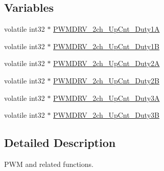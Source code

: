 \subsection*{Variables}
\begin{DoxyCompactItemize}
\item 
volatile int32 $\ast$ \hyperlink{a00038_a8a02650c6afb411447157faf0e90a7b2}{P\-W\-M\-D\-R\-V\-\_\-2ch\-\_\-\-Up\-Cnt\-\_\-\-Duty1\-A}
\item 
volatile int32 $\ast$ \hyperlink{a00038_a23767edc2ebfabc9336684185a4f2d84}{P\-W\-M\-D\-R\-V\-\_\-2ch\-\_\-\-Up\-Cnt\-\_\-\-Duty1\-B}
\item 
volatile int32 $\ast$ \hyperlink{a00038_acc76d5ffc745e63de05baa242bb3d16f}{P\-W\-M\-D\-R\-V\-\_\-2ch\-\_\-\-Up\-Cnt\-\_\-\-Duty2\-A}
\item 
volatile int32 $\ast$ \hyperlink{a00038_a3215b15b28994e0840d64200f09cbfb0}{P\-W\-M\-D\-R\-V\-\_\-2ch\-\_\-\-Up\-Cnt\-\_\-\-Duty2\-B}
\item 
volatile int32 $\ast$ \hyperlink{a00038_a86962b3c7a5a851d9ddce3301a9db727}{P\-W\-M\-D\-R\-V\-\_\-2ch\-\_\-\-Up\-Cnt\-\_\-\-Duty3\-A}
\item 
volatile int32 $\ast$ \hyperlink{a00038_a9550c95286e784256c9f12906ff5a407}{P\-W\-M\-D\-R\-V\-\_\-2ch\-\_\-\-Up\-Cnt\-\_\-\-Duty3\-B}
\end{DoxyCompactItemize}


\subsection{Detailed Description}
P\-W\-M and related functions. 

